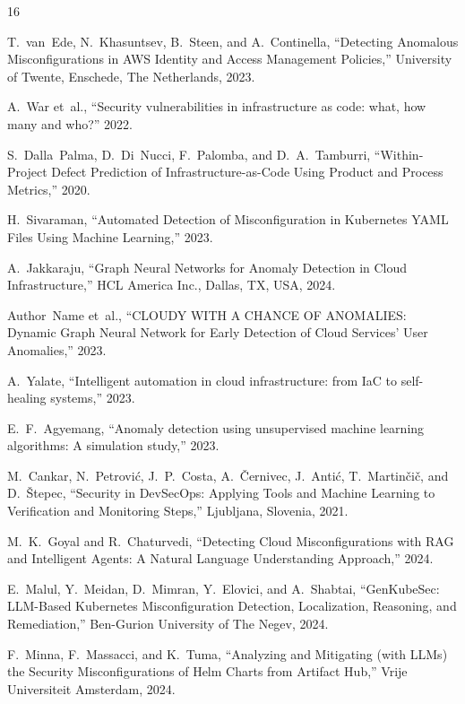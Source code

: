 \documentclass[conference]{IEEEtran}
\begin{document}
\begin{thebibliography}{16}

T.~van~Ede, N.~Khasuntsev, B.~Steen, and A.~Continella, ``Detecting Anomalous Misconfigurations in AWS Identity and Access Management Policies,'' University of Twente, Enschede, The Netherlands, 2023.

A.~War et~al., ``Security vulnerabilities in infrastructure as code: what, how many and who?'' 2022.

S.~Dalla~Palma, D.~Di~Nucci, F.~Palomba, and D.~A.~Tamburri, ``Within-Project Defect Prediction of Infrastructure-as-Code Using Product and Process Metrics,'' 2020.

H.~Sivaraman, ``Automated Detection of Misconfiguration in Kubernetes YAML Files Using Machine Learning,'' 2023.

A.~Jakkaraju, ``Graph Neural Networks for Anomaly Detection in Cloud Infrastructure,'' HCL America Inc., Dallas, TX, USA, 2024.

Author~Name et~al., ``CLOUDY WITH A CHANCE OF ANOMALIES: Dynamic Graph Neural Network for Early Detection of Cloud Services' User Anomalies,'' 2023.

A.~Yalate, ``Intelligent automation in cloud infrastructure: from IaC to self-healing systems,'' 2023.

E.~F.~Agyemang, ``Anomaly detection using unsupervised machine learning algorithms: A simulation study,'' 2023.

M.~Cankar, N.~Petrovi\'{c}, J.~P.~Costa, A.~\v{C}ernivec, J.~Anti\'{c}, T.~Martin\v{c}i\v{c}, and D.~\v{S}tepec, ``Security in DevSecOps: Applying Tools and Machine Learning to Verification and Monitoring Steps,'' Ljubljana, Slovenia, 2021.

M.~K.~Goyal and R.~Chaturvedi, ``Detecting Cloud Misconfigurations with RAG and Intelligent Agents: A Natural Language Understanding Approach,'' 2024.

E.~Malul, Y.~Meidan, D.~Mimran, Y.~Elovici, and A.~Shabtai, ``GenKubeSec: LLM-Based Kubernetes Misconfiguration Detection, Localization, Reasoning, and Remediation,'' Ben-Gurion University of The Negev, 2024.

F.~Minna, F.~Massacci, and K.~Tuma, ``Analyzing and Mitigating (with LLMs) the Security Misconfigurations of Helm Charts from Artifact Hub,'' Vrije Universiteit Amsterdam, 2024.


\end{thebibliography}
\end{document}
